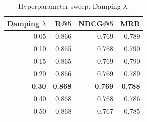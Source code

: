 \begin{table}[t]
\centering
\caption{Hyperparameter sweep: Damping $\lambda$.}
\label{tab:sweep-damping-$\lambda$}
\begin{tabular}{rrrr}
\toprule
Damping $\lambda$ & R@5 & NDCG@5 & MRR \\
\midrule
0.05 & 0.866 & 0.769 & 0.789 \\
0.10 & 0.865 & 0.768 & 0.790 \\
0.15 & 0.865 & 0.769 & 0.790 \\
0.20 & 0.866 & 0.769 & 0.789 \\
\textbf{0.30} & \textbf{0.868} & \textbf{0.769} & \textbf{0.788} \\
0.40 & 0.868 & 0.768 & 0.786 \\
0.50 & 0.868 & 0.767 & 0.785 \\
\bottomrule
\end{tabular}
\end{table}
